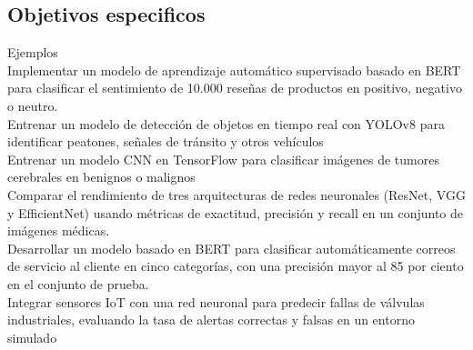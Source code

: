 \subsection{Objetivos especificos}
Ejemplos\\[1cm]
Implementar un modelo de aprendizaje automático supervisado basado en BERT para clasificar el sentimiento de 10.000 reseñas de productos en positivo, negativo o neutro.
\\[1cm]
Entrenar un modelo de detección de objetos en tiempo real con YOLOv8 para identificar peatones, señales de tránsito y otros vehículos
\\[1cm]
Entrenar un modelo CNN en TensorFlow para clasificar imágenes de tumores cerebrales en benignos o malignos
\\[1cm]
Comparar el rendimiento de tres arquitecturas de redes neuronales (ResNet, VGG y EfficientNet) usando métricas de exactitud, precisión y recall en un conjunto de imágenes médicas.
\\[1cm]
Desarrollar un modelo basado en BERT para clasificar automáticamente correos de servicio al cliente en cinco categorías, con una precisión mayor al 85 por ciento en el conjunto de prueba.
\\[1cm]
Integrar sensores IoT con una red neuronal para predecir fallas de válvulas industriales, evaluando la tasa de alertas correctas y falsas en un entorno simulado